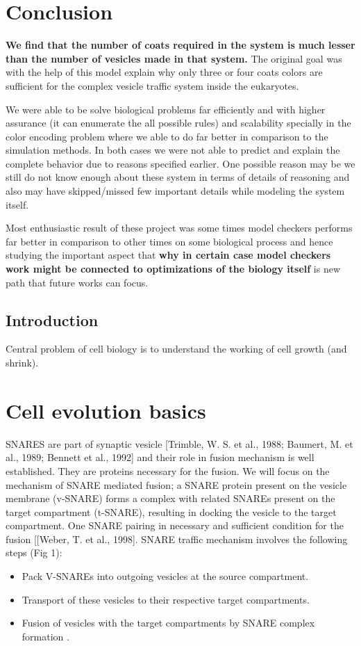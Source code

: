 \documentclass[preprint,12pt]{elsarticle}
\begin{document}
\section{Conclusion}
\textbf{We find that the number of coats required in the system is much lesser than the number of vesicles made in that system.} The original goal was with the help of this model explain why only three or four coats colors are sufficient for the complex vesicle traffic system inside the eukaryotes. 

We were able to be solve biological problems far efficiently and with higher assurance (it can enumerate the all possible rules) and scalability specially in the color encoding problem where we able to do far better in comparison to the simulation methods. In both cases we were not able to predict and explain the complete behavior due to reasons specified earlier. One possible reason may be we still do not know enough about these system in terms of details of reasoning and also may have skipped/missed few important details while modeling the system itself. 

Most enthusiastic result of these project was some times model checkers performs far better in comparison to other times on some biological process and hence studying the important aspect that \textbf{why in certain case model checkers work might be connected to optimizations of the biology itself} is new path that future works can focus.  




\subsection{Introduction}
Central problem of cell biology is to understand the working of cell growth (and shrink). 

\section{Cell evolution basics}
SNARES are part of synaptic vesicle [Trimble, W. S. et al., 1988; Baumert, M. et al., 1989; Bennett et al., 1992] and their role in fusion mechanism is well established. They are proteins necessary for the fusion. We will focus on the mechanism of SNARE mediated fusion; a SNARE protein present on the vesicle membrane (v-SNARE) forms a complex with related SNAREs present on the target compartment (t-SNARE), resulting in docking the vesicle to the target compartment. One SNARE pairing in necessary and sufficient condition for the fusion [[Weber, T. et al., 1998]. 
SNARE traffic mechanism involves the following steps (Fig 1): 
\begin{itemize}
\item Pack V-SNAREs into outgoing vesicles at the source compartment.
\item Transport of these vesicles to their respective target compartments.
\item Fusion of vesicles with the target compartments by SNARE complex formation .
\end{itemize}
\end{document}
